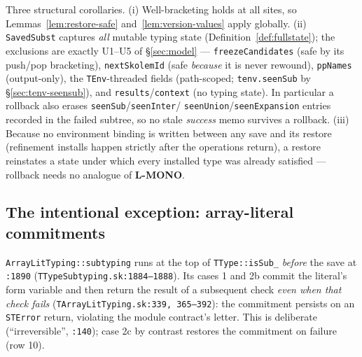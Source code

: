 \documentclass[11pt]{article}
\begin{document}
Three structural corollaries. (i) Well-bracketing holds at all sites, so
Lemmas~\ref{lem:restore-safe} and~\ref{lem:version-values} apply
globally. (ii) \texttt{SavedSubst} captures \emph{all} mutable typing
state (Definition~\ref{def:fullstate}); the exclusions are exactly
U1--U5 of \S\ref{sec:model} — \texttt{freezeCandidates} (safe by its
push/pop bracketing), \texttt{nextSkolemId} (safe \emph{because} it is
never rewound), \texttt{ppNames} (output-only), the
\texttt{TEnv}-threaded fields (path-scoped;
\texttt{tenv.seenSub} by \S\ref{sec:tenv-seensub}), and
\texttt{results}/\texttt{context} (no typing state). In
particular a rollback also erases \texttt{seenSub}/\texttt{seenInter}/%
\texttt{seenUnion}/\texttt{seenExpansion} entries recorded in the failed
subtree, so no stale \emph{success} memo survives a rollback. (iii)
Because no environment binding is written between any save and its
restore (refinement installs happen strictly after the operations
return), a restore reinstates a state under which every installed type
was already satisfied — rollback needs no analogue of \textbf{L-MONO}.

\subsection{The intentional exception: array-literal commitments}
\label{sec:arraylit-exception}

\texttt{ArrayLitTyping::subtyping} runs at the top of
\texttt{TType::isSub\_} \emph{before} the save at \texttt{:1890}
(\texttt{TTypeSubtyping.sk:1884--1888}). Its cases 1 and 2b commit the
literal's form variable and then return the result of a subsequent
check \emph{even when that check fails}
(\texttt{TArrayLitTyping.sk:339, 365--392}): the commitment
persists on an \texttt{STError} return, violating the module contract's
letter. This is deliberate (``irreversible'', \texttt{:140}); case 2c by
contrast restores the commitment on failure (row 10).
\end{document}
